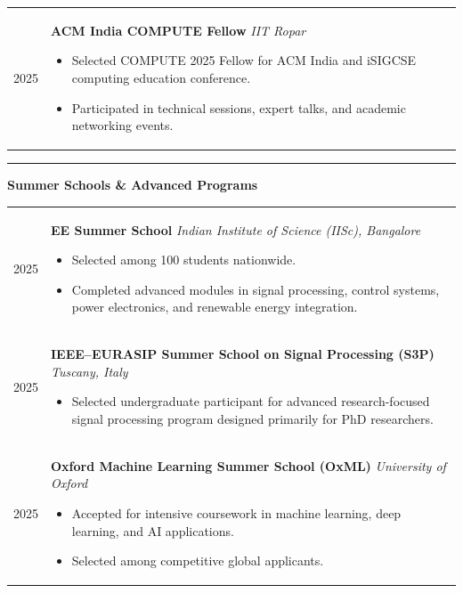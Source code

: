 \documentclass[11pt]{article}
\newcommand{\cvsection}[1]{%
\vspace{12pt}%
\noindent%
{\color{headingblue}\rule{40pt}{5pt}}%
\hspace{10pt}%
{\Large\textbf{\color{headingblue}#1}}%
\vspace{6pt}%
\color{black}%
}
\begin{document}
\begingroup
\renewcommand{\arraystretch}{1.05}
\begin{longtable}{@{}p{95pt}p{\dimexpr\textwidth-95pt\relax}@{}}

2025 &
\textbf{ACM India COMPUTE Fellow} \hfill \textit{IIT Ropar}
\begin{itemize}[leftmargin=*,nosep]
\item Selected COMPUTE 2025 Fellow for ACM India and iSIGCSE computing education conference.
\item Participated in technical sessions, expert talks, and academic networking events.
\end{itemize}
\\[4pt]


\end{longtable}
\endgroup
\cvsection{Summer Schools \& Advanced Programs}

\begingroup
\renewcommand{\arraystretch}{1.05}
\begin{longtable}{@{}p{95pt}p{\dimexpr\textwidth-95pt\relax}@{}}



2025 &
\textbf{EE Summer School} \hfill \textit{Indian Institute of Science (IISc), Bangalore}
\begin{itemize}[leftmargin=*,nosep]
\item Selected among 100 students nationwide.
\item Completed advanced modules in signal processing, control systems, power electronics, and renewable energy integration.
\end{itemize}
\\[4pt]

2025 &
\textbf{IEEE–EURASIP Summer School on Signal Processing (S3P)} \hfill \textit{Tuscany, Italy}
\begin{itemize}[leftmargin=*,nosep]
\item Selected undergraduate participant for advanced research-focused signal processing program designed primarily for PhD researchers.
\end{itemize}
\\[4pt]

2025 &
\textbf{Oxford Machine Learning Summer School (OxML)} \hfill \textit{University of Oxford}
\begin{itemize}[leftmargin=*,nosep]
\item Accepted for intensive coursework in machine learning, deep learning, and AI applications.
\item Selected among competitive global applicants.
\end{itemize}

\end{longtable}
\endgroup
\end{document}

